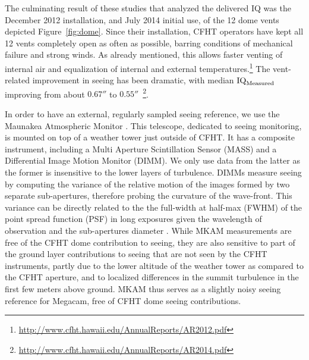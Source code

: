 \iffalse
\begin{figure}
    \centering
    \texttt{[image: figures/relatedWorkFig03.png]}
    \caption{Median of tube seeing are plotted against the air temperature differences between the telescope’s caisson central and top end. The plot shows the total seeing, with local contributions removed as well as the final regression fit line and the minimum expected IQ value expected.~\citep{salmon2009cfht}.}
    \label{fig:relWorkFig03}
\end{figure}
\fi

The culminating result of these studies that analyzed the delivered IQ was the December 2012 installation, and July 2014 initial use, of the 12 dome vents depicted Figure~\ref{fig:dome}. Since their installation, CFHT operators have kept all 12 vents completely open as often as possible, barring conditions of mechanical failure and strong winds. As already mentioned, this allows  faster venting of internal air and  equalization of internal and external temperatures.\footnote{\url{http://www.cfht.hawaii.edu/AnnualReports/AR2012.pdf}}  The vent-related improvement in seeing has been dramatic, %
with median $\textrm{IQ}_{\textrm{Measured}}$ improving from about $0.67''$ to $0.55''$~\footnote{\url{http://www.cfht.hawaii.edu/AnnualReports/AR2014.pdf}}. %

In order to have an external, regularly sampled seeing reference, we use the Maunakea Atmospheric Monitor \citep[MKAM,][]{Skidmore+09,mkam2}. This telescope, dedicated to seeing monitoring, is mounted on top of a weather tower just outside of CFHT. It has a composite instrument, including a Multi Aperture Scintillation Sensor (MASS) and a Differential Image Motion Monitor (DIMM). We only use data from the latter as the former is insensitive to the lower layers of turbulence. DIMMs measure seeing by computing the variance of the relative motion of the images formed by two separate sub-apertures, therefore probing the curvature of the wave-front. This variance can be directly related to the the full-width at half-max (FWHM) of the point spread function (PSF) in long exposures given the wavelength of observation and the sub-apertures diameter \citep[see e.g. ][]{Sarazin+90}. While MKAM measurements are free of the CFHT dome contribution to seeing, they are also sensitive to part of the ground layer contributions to seeing that are not seen by the CFHT instruments, partly due to the lower altitude of the weather tower as compared to the CFHT aperture, and to localized differences in the summit turbulence in the first few meters above ground. MKAM thus serves as a slightly noisy seeing reference for Megacam, free of CFHT dome seeing contributions.

